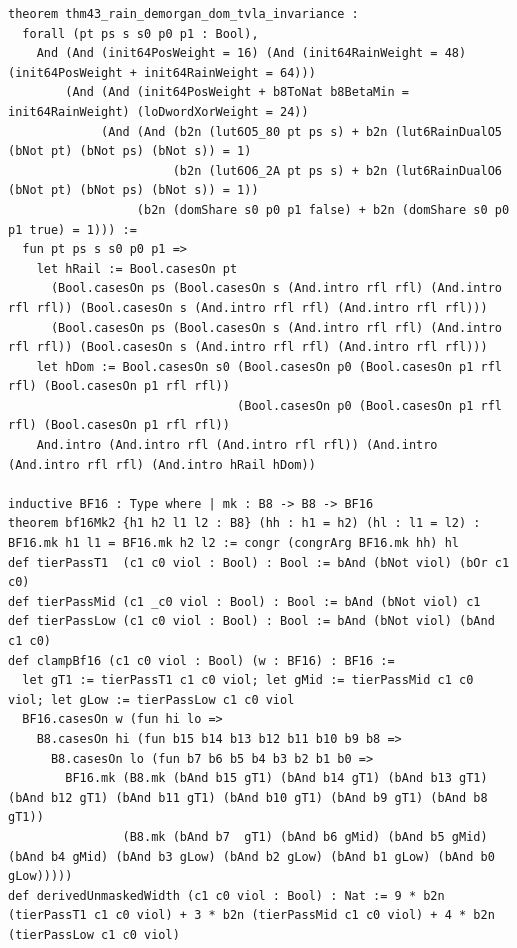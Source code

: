 \documentclass[11pt,letterpaper]{article}
\theoremstyle{spectralthm}
\begin{document}
\begin{lstlisting}[language=Lean4,caption={Standalone Pure Init.Prelude Term-Mode Lean 4 Kernel Suite (thm30--thm61, v0.0.0, 0 sorry, 0 axioms).},label={lst:lean_unified}]
theorem thm43_rain_demorgan_dom_tvla_invariance :
  forall (pt ps s s0 p0 p1 : Bool),
    And (And (init64PosWeight = 16) (And (init64RainWeight = 48) (init64PosWeight + init64RainWeight = 64)))
        (And (And (init64PosWeight + b8ToNat b8BetaMin = init64RainWeight) (loDwordXorWeight = 24))
             (And (And (b2n (lut6O5_80 pt ps s) + b2n (lut6RainDualO5 (bNot pt) (bNot ps) (bNot s)) = 1)
                       (b2n (lut6O6_2A pt ps s) + b2n (lut6RainDualO6 (bNot pt) (bNot ps) (bNot s)) = 1))
                  (b2n (domShare s0 p0 p1 false) + b2n (domShare s0 p0 p1 true) = 1))) :=
  fun pt ps s s0 p0 p1 =>
    let hRail := Bool.casesOn pt
      (Bool.casesOn ps (Bool.casesOn s (And.intro rfl rfl) (And.intro rfl rfl)) (Bool.casesOn s (And.intro rfl rfl) (And.intro rfl rfl)))
      (Bool.casesOn ps (Bool.casesOn s (And.intro rfl rfl) (And.intro rfl rfl)) (Bool.casesOn s (And.intro rfl rfl) (And.intro rfl rfl)))
    let hDom := Bool.casesOn s0 (Bool.casesOn p0 (Bool.casesOn p1 rfl rfl) (Bool.casesOn p1 rfl rfl))
                                (Bool.casesOn p0 (Bool.casesOn p1 rfl rfl) (Bool.casesOn p1 rfl rfl))
    And.intro (And.intro rfl (And.intro rfl rfl)) (And.intro (And.intro rfl rfl) (And.intro hRail hDom))

inductive BF16 : Type where | mk : B8 -> B8 -> BF16
theorem bf16Mk2 {h1 h2 l1 l2 : B8} (hh : h1 = h2) (hl : l1 = l2) : BF16.mk h1 l1 = BF16.mk h2 l2 := congr (congrArg BF16.mk hh) hl
def tierPassT1  (c1 c0 viol : Bool) : Bool := bAnd (bNot viol) (bOr c1 c0)
def tierPassMid (c1 _c0 viol : Bool) : Bool := bAnd (bNot viol) c1
def tierPassLow (c1 c0 viol : Bool) : Bool := bAnd (bNot viol) (bAnd c1 c0)
def clampBf16 (c1 c0 viol : Bool) (w : BF16) : BF16 :=
  let gT1 := tierPassT1 c1 c0 viol; let gMid := tierPassMid c1 c0 viol; let gLow := tierPassLow c1 c0 viol
  BF16.casesOn w (fun hi lo =>
    B8.casesOn hi (fun b15 b14 b13 b12 b11 b10 b9 b8 =>
      B8.casesOn lo (fun b7 b6 b5 b4 b3 b2 b1 b0 =>
        BF16.mk (B8.mk (bAnd b15 gT1) (bAnd b14 gT1) (bAnd b13 gT1) (bAnd b12 gT1) (bAnd b11 gT1) (bAnd b10 gT1) (bAnd b9 gT1) (bAnd b8 gT1))
                (B8.mk (bAnd b7  gT1) (bAnd b6 gMid) (bAnd b5 gMid) (bAnd b4 gMid) (bAnd b3 gLow) (bAnd b2 gLow) (bAnd b1 gLow) (bAnd b0 gLow)))))
def derivedUnmaskedWidth (c1 c0 viol : Bool) : Nat := 9 * b2n (tierPassT1 c1 c0 viol) + 3 * b2n (tierPassMid c1 c0 viol) + 4 * b2n (tierPassLow c1 c0 viol)


\end{lstlisting}
\end{document}
